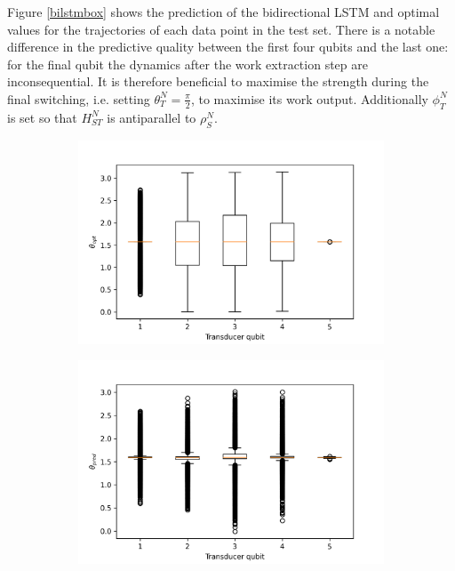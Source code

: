 Figure \ref{bilstmbox} shows the prediction of the bidirectional LSTM and optimal values for the trajectories of each data point in the test set.
There is a notable difference in the predictive quality between the first four qubits and the last one: for the final qubit the dynamics after the work extraction step are inconsequential.
It is therefore beneficial to maximise the strength during the final switching, i.e. setting $\theta_T^N = \frac{\pi}{2}$, to maximise its work output.
Additionally $\phi_T^N$ is set so that $H_{ST}^N$ is antiparallel to $\rho_S^N$.


\begin{figure}
	\centering
	\begin{subfigure}{0.32\textwidth}
		\centering
		\includegraphics[width=\textwidth]{img/theta_opt_box}
	\end{subfigure}
	\begin{subfigure}{0.32\textwidth}
		\centering
		\includegraphics[width=\textwidth]{img/theta_pred_box}

\end{subfigure}
\end{figure}
